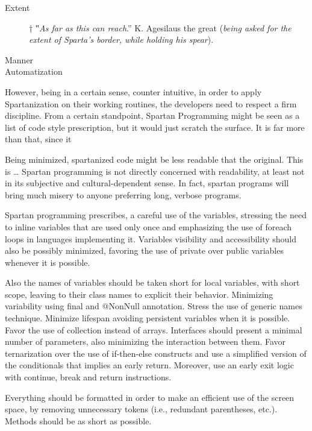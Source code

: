 \begin{description}
  \item[Extent]†{%
     ‟\textit{As far as this can reach}.” K. Agesilaus the great
     (\textsl{being asked for the extent of Sparta's border, while holding his spear}).
  }
  \item[Manner]
  \item[Automatization]
\end{description}

However, being in a certain sense, counter intuitive, in order to apply
Spartanization on their working routines, the developers need to respect a firm
discipline. From a certain standpoint, Spartan Programming might be seen as a
list of code style prescription, but it would just scratch the surface. It is
far more than that, since it

Being minimized, spartanized code might be less readable that the original.
This is … Spartan programming is not directly concerned with readability, at
least not in its subjective and cultural-dependent sense. In fact, spartan
programs will bring much misery to anyone preferring long, verbose programs.

Spartan programming prescribes, a careful use of the variables, stressing the need
to inline variables that are used only once and emphasizing the use of foreach loops
in languages implementing it. Variables visibility and accessibility should also be
possibly minimized, favoring the use of private over public variables whenever it
is possible.

Also the names of variables should be taken short for local variables, with
short scope, leaving to their class names to explicit their behavior.
Minimizing variability using final and @NonNull annotation. Stress the use of
generic names technique. Minimize lifespan avoiding persistent variables when
it is possible. Favor the use of collection instead of arrays. Interfaces
should present a minimal number of parameters, also minimizing the interaction
between them. Favor ternarization over the use of if-then-else constructs and
use a simplified version of the conditionals that implies an early return.
Moreover, use an early exit logic with continue, break and return instructions.

Everything should be formatted in order to make an efficient use of the screen
space, by removing unnecessary tokens (i.e., redundant parentheses, etc.).
Methods should be as short as possible.

